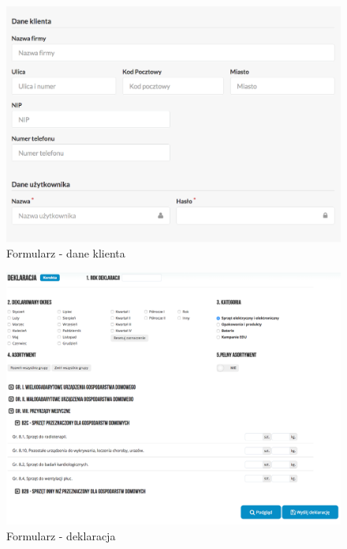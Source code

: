 	\begin{figure}[H]
		\centering
		\centerline{\includegraphics[width=\textwidth]{partials/2-wymagania/dokumenty/dane-klienta.png}}
		\caption{Formularz - dane klienta}
	\end{figure}

	\begin{figure}[H]
		\centering
		\centerline{\includegraphics[width=1.2\textwidth]{partials/2-wymagania/dokumenty/deklaracja-form.png}}
		\caption{Formularz - deklaracja}
	\end{figure}

